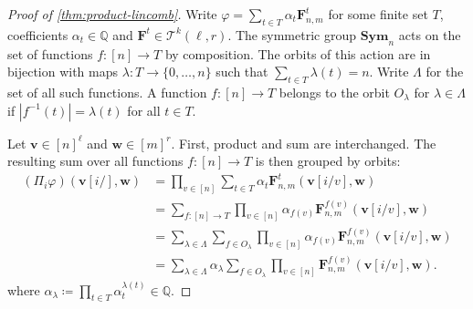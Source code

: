\documentclass[10pt,a4paper]{article}
\theoremstyle{definition}
\theoremstyle{plain}
\theoremstyle{remark}
\renewcommand{\phi}{\varphi}
\newcommand{\Sym}{\mathbf{Sym}}
\begin{document}
	
	\begin{proof}[Proof of \cref{thm:product-lincomb}]
		Write $\phi = \sum_{t \in T} \alpha_t \boldsymbol{F}^t_{n,m}$ for some finite set $T$,
		coefficients $\alpha_t \in \mathbb{Q}$ and $\boldsymbol{F}^t \in \mathcal{T}^k(\ell, r)$.
		The symmetric group $\Sym_n$ acts on the set of functions $f \colon [n] \to T$ by composition.
		The orbits of this action are in bijection with maps $\lambda \colon T \to \{0, \dots, n\}$ such that $\sum_{t\in T} \lambda(t) = n$.
		Write $\Lambda$ for the set of all such functions.
		A function $f \colon [n] \to T$ belongs to the orbit $O_\lambda$ for $\lambda \in \Lambda$ if $|f^{-1}(t)| = \lambda(t)$ for all $t \in T$.
		
		Let $\boldsymbol{v} \in [n]^\ell$ and $\boldsymbol{w} \in [m]^r$.
		First, product and sum are interchanged. The resulting sum over all functions $f \colon [n] \to T$ is then grouped by orbits:
		\begin{align*}
			(\Pi_i \phi)(\boldsymbol{v}[i/], \boldsymbol{w})
			&= \prod_{v \in [n]} \sum_{t \in T} \alpha_t \boldsymbol{F}_{n,m}^t(\boldsymbol{v}[i/v], \boldsymbol{w}) \\
			&= \sum_{f \colon [n] \to T} \prod_{v \in [n]} \alpha_{f(v)} \boldsymbol{F}_{n,m}^{f(v)}(\boldsymbol{v}[i/v], \boldsymbol{w}) \\
			&= \sum_{\lambda \in \Lambda} \sum_{f \in O_\lambda} \prod_{v \in [n]} \alpha_{f(v)} \boldsymbol{F}_{n,m}^{f(v)}(\boldsymbol{v}[i/v], \boldsymbol{w}) \\
			&= \sum_{\lambda \in \Lambda} \alpha_\lambda  \sum_{f \in O_\lambda} \prod_{v \in [n]} \boldsymbol{F}_{n,m}^{f(v)}(\boldsymbol{v}[i/v], \boldsymbol{w}).
		\end{align*}
		where $\alpha_\lambda \coloneqq \prod_{t \in T} \alpha_t^{\lambda(t)} \in \mathbb{Q}$.
		

\end{proof}
\end{document}
